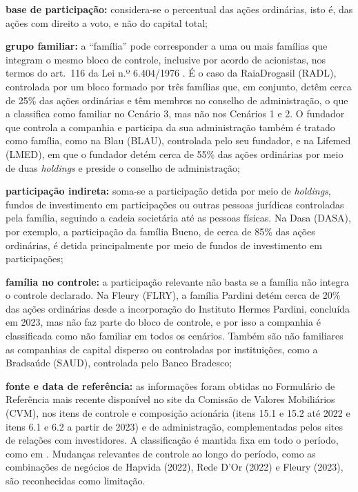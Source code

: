\begin{alineas}
\item \textbf{base de participação:} considera-se o percentual das ações
ordinárias, isto é, das ações com direito a voto, e não do capital total;

\item \textbf{grupo familiar:} a ``família'' pode corresponder a uma ou mais
famílias que integram o mesmo bloco de controle, inclusive por acordo de
acionistas, nos termos do art.~116 da Lei n.º 6.404/1976 \cite{brasil1976}. É o
caso da RaiaDrogasil (RADL), controlada por um bloco formado por três famílias
que, em conjunto, detêm cerca de 25\% das ações ordinárias e têm membros no
conselho de administração, o que a classifica como familiar no Cenário 3, mas não
nos Cenários 1 e 2. O fundador que controla a companhia e participa da sua
administração também é tratado como família, como na Blau (BLAU), controlada pelo
seu fundador, e na Lifemed (LMED), em que o fundador detém cerca de 55\% das ações
ordinárias por meio de duas \textit{holdings} e preside o conselho de
administração;

\item \textbf{participação indireta:} soma-se a participação detida por meio de
\textit{holdings}, fundos de investimento em participações ou outras pessoas
jurídicas controladas pela família, seguindo a cadeia societária até as pessoas
físicas. Na Dasa (DASA), por exemplo, a participação da família Bueno, de cerca de
85\% das ações ordinárias, é detida principalmente por meio de fundos de
investimento em participações;

\item \textbf{família no controle:} a participação relevante não basta se a
família não integra o controle declarado. Na Fleury (FLRY), a família Pardini
detém cerca de 20\% das ações ordinárias desde a incorporação do Instituto Hermes
Pardini, concluída em 2023, mas não faz parte do bloco de controle, e por isso a companhia é
classificada como não familiar em todos os cenários. Também são não familiares as
companhias de capital disperso ou controladas por instituições, como a Bradsaúde
(SAUD), controlada pelo Banco Bradesco;

\item \textbf{fonte e data de referência:} as informações foram obtidas no
Formulário de Referência mais recente disponível no site da Comissão de Valores
Mobiliários (CVM), nos itens de controle e composição acionária (itens 15.1 e 15.2
até 2022 e itens 6.1 e 6.2 a partir de 2023) e de administração, complementadas
pelos sites de relações com investidores. A classificação é mantida fixa em todo o
período, como em . Mudanças relevantes de controle ao
longo do período, como as combinações de negócios de Hapvida (2022), Rede
D'Or (2022) e Fleury (2023), são reconhecidas como limitação.
\end{alineas}


